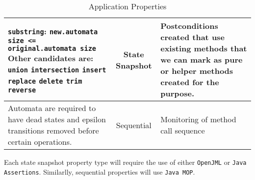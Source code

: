 \documentclass[letterpaper,11pt]{article}
\begin{document}
\begin{table}[ht]
\begin{tabular}{p{5cm} c p{5cm}}
    \texttt{substring}: \texttt{new.automata size <= original.automata size}
    Other candidates are:
    \texttt{union}
    \texttt{intersection}
    \texttt{insert}
    \texttt{replace}
    \texttt{delete}
    \texttt{trim}
    \texttt{reverse}
                         & State Snapshot & Postconditions created that use
                                            existing methods that we can mark
                                            as pure or helper methods created
                                            for the purpose. \\
    \midrule
    Automata are required to have dead states and epsilon transitions removed
    before certain operations. & Sequential & Monitoring of method call
                                              sequence \\
    \bottomrule
  \end{tabular}
  \caption{Application Properties}
\end{table}

Each state snapshot property type will require the use of either
\texttt{OpenJML} or \texttt{Java Assertions}.  Similarlly, sequential
properties will use \texttt{Java MOP}.

\nocite{*}


\end{document}
